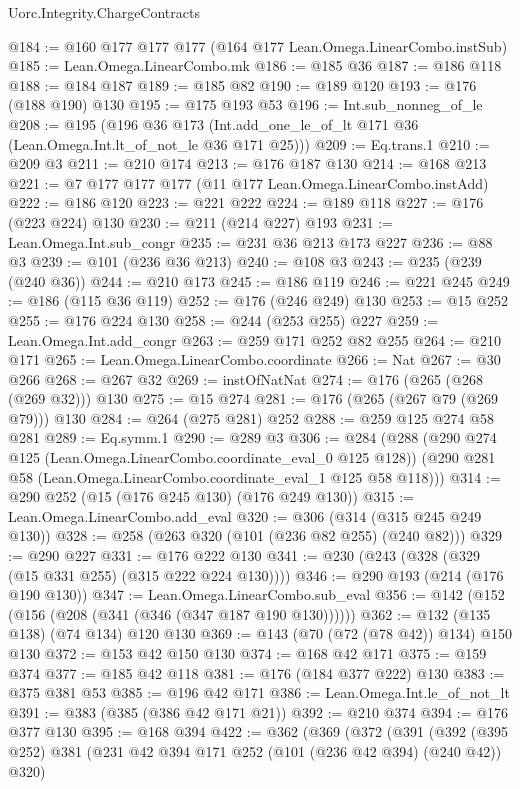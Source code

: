 \begin{lexlean}{Uorc.Integrity.ChargeContracts}
\begin{coremodule}
@184 := @160 @177 @177 @177 (@164 @177 Lean.Omega.LinearCombo.instSub)
@185 := Lean.Omega.LinearCombo.mk
@186 := @185 @36
@187 := @186 @118
@188 := @184 @187
@189 := @185 @82
@190 := @189 @120
@193 := @176 (@188 @190) @130
@195 := @175 @193 @53
@196 := Int.sub_nonneg_of_le
@208 := @195
    (@196 @36 @173 (Int.add_one_le_of_lt @171 @36 (Lean.Omega.Int.lt_of_not_le @36 @171 @25)))
@209 := Eq.trans.{1}
@210 := @209 @3
@211 := @210 @174
@213 := @176 @187 @130
@214 := @168 @213
@221 := @7 @177 @177 @177 (@11 @177 Lean.Omega.LinearCombo.instAdd)
@222 := @186 @120
@223 := @221 @222
@224 := @189 @118
@227 := @176 (@223 @224) @130
@230 := @211 (@214 @227) @193
@231 := Lean.Omega.Int.sub_congr
@235 := @231 @36 @213 @173 @227
@236 := @88 @3
@239 := @101 (@236 @36 @213)
@240 := @108 @3
@243 := @235 (@239 (@240 @36))
@244 := @210 @173
@245 := @186 @119
@246 := @221 @245
@249 := @186 (@115 @36 @119)
@252 := @176 (@246 @249) @130
@253 := @15 @252
@255 := @176 @224 @130
@258 := @244 (@253 @255) @227
@259 := Lean.Omega.Int.add_congr
@263 := @259 @171 @252 @82 @255
@264 := @210 @171
@265 := Lean.Omega.LinearCombo.coordinate
@266 := Nat
@267 := @30 @266
@268 := @267 @32
@269 := instOfNatNat
@274 := @176 (@265 (@268 (@269 @32))) @130
@275 := @15 @274
@281 := @176 (@265 (@267 @79 (@269 @79))) @130
@284 := @264 (@275 @281) @252
@288 := @259 @125 @274 @58 @281
@289 := Eq.symm.{1}
@290 := @289 @3
@306 := @284
    (@288
      (@290 @274 @125 (Lean.Omega.LinearCombo.coordinate_eval_0 @125 @128))
      (@290 @281 @58 (Lean.Omega.LinearCombo.coordinate_eval_1 @125 @58 @118)))
@314 := @290 @252 (@15 (@176 @245 @130) (@176 @249 @130))
@315 := Lean.Omega.LinearCombo.add_eval
@320 := @306 (@314 (@315 @245 @249 @130))
@328 := @258 (@263 @320 (@101 (@236 @82 @255) (@240 @82)))
@329 := @290 @227
@331 := @176 @222 @130
@341 := @230 (@243 (@328 (@329 (@15 @331 @255) (@315 @222 @224 @130))))
@346 := @290 @193 (@214 (@176 @190 @130))
@347 := Lean.Omega.LinearCombo.sub_eval
@356 := @142 (@152 (@156 (@208 (@341 (@346 (@347 @187 @190 @130))))))
@362 := @132 (@135 @138) (@74 @134) @120 @130
@369 := @143 (@70 (@72 (@78 @42)) @134) @150 @130
@372 := @153 @42 @150 @130
@374 := @168 @42 @171
@375 := @159 @374
@377 := @185 @42 @118
@381 := @176 (@184 @377 @222) @130
@383 := @375 @381 @53
@385 := @196 @42 @171
@386 := Lean.Omega.Int.le_of_not_lt
@391 := @383 (@385 (@386 @42 @171 @21))
@392 := @210 @374
@394 := @176 @377 @130
@395 := @168 @394
@422 := @362
    (@369
      (@372
        (@391
          (@392
            (@395 @252)
            @381
            (@231 @42 @394 @171 @252 (@101 (@236 @42 @394) (@240 @42)) @320)

\end{coremodule}
\end{lexlean}
